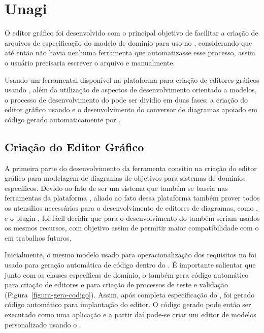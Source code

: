\chapter{Unagi}
\label{sec-unagi}

O editor gráfico \unagi foi desenvolvido com o principal objetivo de facilitar a criação de arquivos de especificação do modelo de dominio para uso no \zanshin, considerando que até então não havia nenhuma ferramenta que automatizasse esse processo, assim o usuário precisaria escrever o arquivo \xml e \ecore manualmente. 

Usando um ferramental disponível na plataforma \eclipse para criação de editores gráficos usando \emf, além da utilização de aspectos de desenvolvimento orientado a modelos, o processo de desenvolvimento do \unagi pode ser dividio em duas fases: a criação do editor gráfico usando \sirius e o desenvolvimento do conversor de diagramas apoiado em código gerado automaticamente por \mdd.

\section{Criação do Editor Gráfico}
\label{sec-unagi-criacao-editor}

A primeira parte do desenvolvimento da ferramenta consitiu  na criação do editor gráfico para modelagem de diagramas de objetivos para sistemas de domínios específicos. Devido ao fato de \zanshin ser um sistema que também se baseia nas ferramentas da plataforma \eclipse, aliado ao fato dessa plataforma também prover todos os utensílios necessários para o desenvolvimento de editores de diagramas, como \ecore, \emf e o plugin \sirius, foi fácil decidir que para o desenvolvimento do \unagi também seriam usados os mesmos recursos, com objetivo assim de permitir maior compatibilidade com o \zanshin em trabalhos futuros.

Inicialmente, o mesmo modelo \ecore usado para operacionalização dos requisitos no \zanshin foi usado para geração automática de código dentro do \eclipse \emf. É importante salientar que junto com as classes específicas de domínio, o \emf também gera código automático para criação de editores e para criação de processos de teste e validação (Figura~\ref{figura-gera-codigo}). Assim, após completa especificação do \ecore, foi gerado código automático para implantação do editor. O código gerado pode então ser executado como uma aplicação \eclipse e a partir daí pode-se criar um editor de modelos personalizado usando o \sirius.

